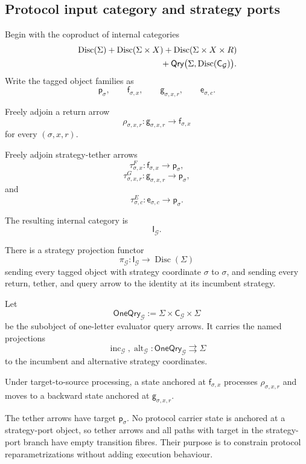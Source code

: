 \subsection{Protocol input category and strategy ports}

Begin with the coproduct of internal categories
\[
\begin{aligned}
  &
  \operatorname{Disc}(\Sigma)
  +
  \operatorname{Disc}(\Sigma\times X)
  +
  \operatorname{Disc}(\Sigma\times X\times R)
  \\
  &\hspace{35mm}
  +
  \mathsf{Qry}
  \bigl(
    \Sigma,
    \operatorname{Disc}(\mathsf C_{\mathcal G})
  \bigr).
\end{aligned}
\]
Write the tagged object families as
\[
  \mathsf p_\sigma,
  \qquad
  \mathsf f_{\sigma,x},
  \qquad
  \mathsf g_{\sigma,x,r},
  \qquad
  \mathsf e_{\sigma,c}.
\]

Freely adjoin a return arrow
\[
  \rho_{\sigma,x,r}:
  \mathsf g_{\sigma,x,r}
  \longrightarrow
  \mathsf f_{\sigma,x}
\]
for every \((\sigma,x,r)\).

Freely adjoin strategy-tether arrows
\[
  \tau^F_{\sigma,x}:
  \mathsf f_{\sigma,x}
  \longrightarrow
  \mathsf p_\sigma,
\]
\[
  \tau^G_{\sigma,x,r}:
  \mathsf g_{\sigma,x,r}
  \longrightarrow
  \mathsf p_\sigma,
\]
and
\[
  \tau^E_{\sigma,c}:
  \mathsf e_{\sigma,c}
  \longrightarrow
  \mathsf p_\sigma.
\]

The resulting internal category is
\[
  \mathsf I_{\mathcal G}.
\]

There is a strategy projection functor
\[
  \pi_{\mathcal G}:
  \mathsf I_{\mathcal G}
  \longrightarrow
  \operatorname{Disc}(\Sigma)
\]
sending every tagged object with strategy coordinate \(\sigma\) to \(\sigma\), and sending every
return, tether, and query arrow to the identity at its incumbent strategy.

Let
\[
  \mathsf{OneQry}_{\mathcal G}
  :=
  \Sigma\times\mathsf C_{\mathcal G}\times\Sigma
\]
be the subobject of one-letter evaluator query arrows. It carries the named projections
\[
  \operatorname{inc}_{\mathcal G},
  \operatorname{alt}_{\mathcal G}:
  \mathsf{OneQry}_{\mathcal G}
  \rightrightarrows
  \Sigma
\]
to the incumbent and alternative strategy coordinates.

Under target-to-source processing, a state anchored at
\(\mathsf f_{\sigma,x}\) processes \(\rho_{\sigma,x,r}\) and moves to a backward state anchored at
\(\mathsf g_{\sigma,x,r}\).

The tether arrows have target \(\mathsf p_\sigma\). No protocol carrier state is anchored at a
strategy-port object, so tether arrows and all paths with target in the strategy-port branch have
empty transition fibres. Their purpose is to constrain protocol reparametrizations without adding
execution behaviour.


